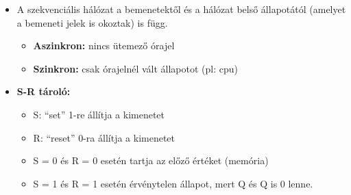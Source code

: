 \documentclass[11pt,a4paper]{article}
\begin{document}
            \begin{tcolorbox}[colback=blue!5!white,colframe=blue!50!black,title= 10. Ismertesse az S-R tároló példáján keresztül a szekvenciális logikai hálózatok elvét!]
                \begin{itemize}
                    \item A szekvenciális hálózat a bemenetektől és a hálózat belső állapotától (amelyet a bemeneti jelek is okoztak) is függ.
                    \begin{itemize}
                        \item \textbf{Aszinkron:} nincs ütemező órajel
                        \item \textbf{Szinkron:} csak órajelnél vált állapotot (pl: cpu)
                    \end{itemize}
                \end{itemize}
                \begin{center}
                \end{center}
                    \begin{itemize}
                        \item \textbf{S-R tároló:}
                        \begin{itemize}
                        \item S: “set” 1-re állítja a kimenetet
                        \item R: “reset” 0-ra állítja a kimenetet
                        \item S = 0 és R = 0 esetén tartja az előző értéket (memória)
                        \item S = 1 és R = 1 esetén érvénytelen állapot, mert Q és Q is 0 lenne.

\end{itemize}
\end{itemize}
\end{tcolorbox}
\end{document}
